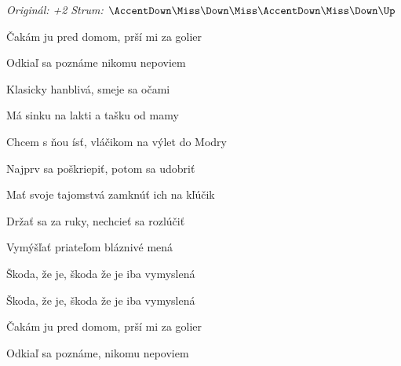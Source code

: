 \begin{song}


\begin{headerbox}
\RaiseBoxWithAccents
\textit{Originál: +2} \quad
\textit{Strum:} $\AccentDown\Miss\Down\Miss\AccentDown\Miss\Down\Up$
\end{headerbox}

\begin{hchordbox}
\end{hchordbox}

\Large

\bigskip

Čakám ju pred domom,  prší mi za golier \par
{}Odkiaľ sa poznáme  nikomu nepoviem \par
{}Klasicky hanblivá, smeje sa očami \par
{}Má sinku na lakti  a tašku od mamy \par

\bigskip

Chcem s ňou ísť, vláčikom na výlet do Modry \par
Najprv sa poškriepiť, potom sa udobriť \par
Mať svoje tajomstvá zamknúť ich na kľúčik \par
Držať sa za ruky, nechcieť sa rozlúčiť \par

\bigskip

Vymýšľať priateľom bláznivé mená \par
Škoda, že je, škoda že je iba vymyslená \par
Škoda, že je, škoda že je iba vymyslená \par

\bigskip

    \par

\bigskip

Čakám ju pred domom,  prší mi za golier \par
{}Odkiaľ sa poznáme,  nikomu nepoviem \par


\end{song}
